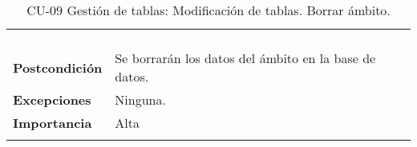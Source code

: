 \begin{longtable}[H]{@{}ll@{}}
\begin{minipage}[t]{0.71\columnwidth}
\begin{enumerate}
\end{enumerate}\strut
\end{minipage}\tabularnewline
\begin{minipage}[t]{0.23\columnwidth}\raggedright\strut
\textbf{Postcondición}\strut
\end{minipage} & \begin{minipage}[t]{0.71\columnwidth}\raggedright\strut
Se borrarán los datos del ámbito en la base de datos.\strut
\end{minipage}\tabularnewline
\begin{minipage}[t]{0.23\columnwidth}\raggedright\strut
\textbf{Excepciones}\strut
\end{minipage} & \begin{minipage}[t]{0.71\columnwidth}\raggedright\strut
Ninguna. \strut
\end{minipage}\tabularnewline
\begin{minipage}[t]{0.23\columnwidth}\raggedright\strut
\textbf{Importancia}\strut
\end{minipage} & \begin{minipage}[t]{0.71\columnwidth}\raggedright\strut
Alta\strut
\end{minipage}\tabularnewline
\bottomrule
\caption{CU-09 Gestión de tablas: Modificación de tablas. Borrar ámbito.}
\end{longtable}

